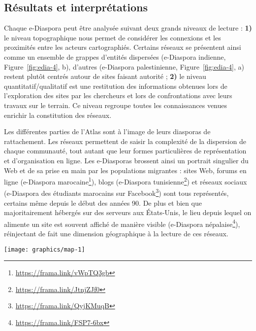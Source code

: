\documentclass[symmetric,justified,marginals=raggedouter]{tufte-book}
\begin{document}
\subsection{Résultats et interprétations}

\noindent Chaque e-Diaspora peut être analysée suivant deux grands niveaux de lecture : \textbf{1)} le niveau topographique nous permet de considérer les connexions et les proximités entre les acteurs cartographiés. Certains réseaux se présentent ainsi comme un ensemble de grappes d'entités dispersées (e-Diaspora indienne, Figure~\ref{fig:edia-4}, b), d'autres (e-Diaspora palestinienne, Figure~\ref{fig:edia-4}, a) restent plutôt centrés autour de sites faisant autorité \citep{ben-david_palestinian_2012}; \textbf{2)} le niveau quantitatif/qualitatif est une restitution des informations obtenues lors de l'exploration des sites par les chercheurs et lors de confrontations avec leurs travaux sur le terrain. Ce niveau regroupe toutes les connaissances venues enrichir la constitution des réseaux.

Les différentes parties de l'Atlas sont à l'image de leurs diasporas de rattachement. Les réseaux permettent de saisir la complexité de la dispersion de chaque communauté, tout autant que leur formes particulières de représentation et d'organisation en ligne. Les e-Diasporas brossent ainsi un portrait singulier du Web et de sa prise en main par les populations migrantes : sites Web, forums en ligne (e-Diaspora marocaine\footnote{\RaggedOuter \url{https://frama.link/vWpTQ3gb}}), blogs (e-Diaspora tunisienne\footnote{\RaggedOuter \url{https://frama.link/JtnjZJf0}}) et réseaux sociaux (e-Diaspora des étudiants marocains sur Facebook\footnote{\RaggedOuter \url{https://frama.link/QyjKMuqB}}) sont tous représentés, certains même depuis le début des années 90. De plus et bien que majoritairement hébergés sur des serveurs aux États-Unis, le lieu depuis lequel on alimente un site est souvent affiché de manière visible (e-Diaspora népalaise\footnote{\RaggedOuter \url{https://frama.link/FSP7-6bx}}), réinjectant de fait une dimension géographique à la lecture de ces réseaux.

\begin{figure*}
  \texttt{[image: graphics/map-1]}
  \caption{L'e-Diaspora palestinienne (a, par A. Ben-David) et l'e-Diaspora indienne (b, par E. Leclerc)}
  \label{fig:edia-4}
\end{figure*}
\end{document}
